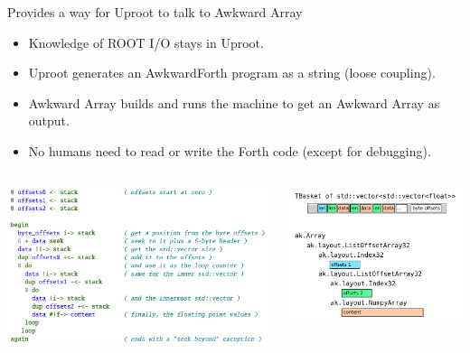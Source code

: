 \documentclass[aspectratio=169]{beamer}
\begin{document}
\begin{frame}{Provides a way for Uproot to talk to Awkward Array}
\vspace{0.25 cm}
\begin{itemize}
\item Knowledge of ROOT I/O stays in Uproot.
\item Uproot generates an AwkwardForth program as a string (loose coupling).
\item Awkward Array builds and runs the machine to get an Awkward Array as output.
\item No humans need to read or write the Forth code (except for debugging).
\end{itemize}

\begin{columns}

\includegraphics[width=1.1\linewidth]{forth-parsing-example.png}

\includegraphics[width=\linewidth]{tbasket-to-awkward-nested.pdf}

\end{columns}
\end{frame}
\end{document}
